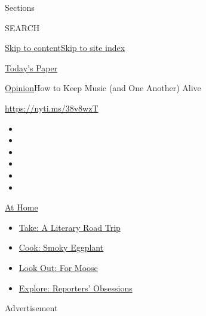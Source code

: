 Sections

SEARCH

\protect\hyperlink{site-content}{Skip to
content}\protect\hyperlink{site-index}{Skip to site index}

\href{https://myaccount.nytimes3xbfgragh.onion/auth/login?response_type=cookie\&client_id=vi}{}

\href{https://www.nytimes3xbfgragh.onion/section/todayspaper}{Today's
Paper}

\href{/section/opinion}{Opinion}\textbar{}How to Keep Music (and One
Another) Alive

\url{https://nyti.ms/38v8wzT}

\begin{itemize}
\item
\item
\item
\item
\item
\item
\end{itemize}

\href{https://www.nytimes3xbfgragh.onion/spotlight/at-home?action=click\&pgtype=Article\&state=default\&region=TOP_BANNER\&context=at_home_menu}{At
Home}

\begin{itemize}
\tightlist
\item
  \href{https://www.nytimes3xbfgragh.onion/2020/07/28/books/time-for-a-literary-road-trip.html?action=click\&pgtype=Article\&state=default\&region=TOP_BANNER\&context=at_home_menu}{Take:
  A Literary Road Trip}
\item
  \href{https://www.nytimes3xbfgragh.onion/2020/07/29/magazine/bored-with-your-home-cooking-some-smoky-eggplant-will-fix-that.html?action=click\&pgtype=Article\&state=default\&region=TOP_BANNER\&context=at_home_menu}{Cook:
  Smoky Eggplant}
\item
  \href{https://www.nytimes3xbfgragh.onion/2020/07/27/travel/moose-michigan-isle-royale.html?action=click\&pgtype=Article\&state=default\&region=TOP_BANNER\&context=at_home_menu}{Look
  Out: For Moose}
\item
  \href{https://www.nytimes3xbfgragh.onion/interactive/2020/at-home/even-more-reporters-editors-diaries-lists-recommendations.html?action=click\&pgtype=Article\&state=default\&region=TOP_BANNER\&context=at_home_menu}{Explore:
  Reporters' Obsessions}
\end{itemize}

Advertisement

